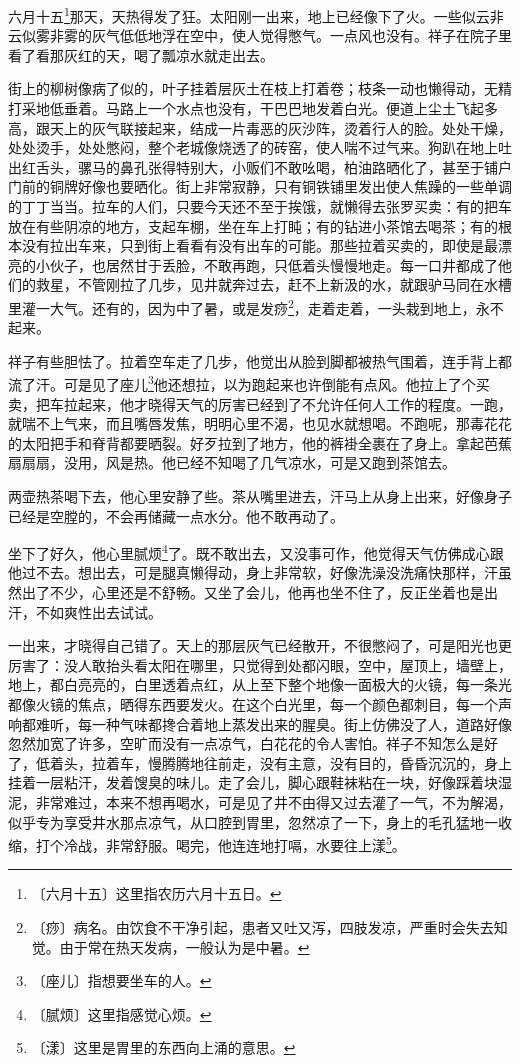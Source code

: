 \documentclass[12pt,UTF-8,openany]{ctexbook}
\begin{document}
\begin{large}
    
    六月十五\footnote{〔六月十五〕这里指农历六月十五日。}那天，天热得发了狂。太阳刚一出来，地上已经像下了火。一些似云非云似雾非雾的灰气低低地浮在空中，使人觉得憋气。一点风也没有。祥子在院子里看了看那灰红的天，喝了瓢凉水就走出去。
    
    街上的柳树像病了似的，叶子挂着层灰土在枝上打着卷；枝条一动也懒得动，无精打采地低垂着。马路上一个水点也没有，干巴巴地发着白光。便道上尘土飞起多高，跟天上的灰气联接起来，结成一片毒恶的灰沙阵，烫着行人的脸。处处干燥，处处烫手，处处憋闷，整个老城像烧透了的砖窑，使人喘不过气来。狗趴在地上吐出红舌头，骡马的鼻孔张得特别大，小贩们不敢吆喝，柏油路晒化了，甚至于铺户门前的铜牌好像也要晒化。街上非常寂静，只有铜铁铺里发出使人焦躁的一些单调的丁丁当当。拉车的人们，只要今天还不至于挨饿，就懒得去张罗买卖：有的把车放在有些阴凉的地方，支起车棚，坐在车上打盹；有的钻进小茶馆去喝茶；有的根本没有拉出车来，只到街上看看有没有出车的可能。那些拉着买卖的，即使是最漂亮的小伙子，也居然甘于丢脸，不敢再跑，只低着头慢慢地走。每一口井都成了他们的救星，不管刚拉了几步，见井就奔过去，赶不上新汲的水，就跟驴马同在水槽里灌一大气。还有的，因为中了暑，或是发痧\footnote{〔痧〕病名。由饮食不干净引起，患者又吐又泻，四肢发凉，严重时会失去知觉。由于常在热天发病，一般认为是中暑。}，走着走着，一头栽到地上，永不起来。
    
    祥子有些胆怯了。拉着空车走了几步，他觉出从脸到脚都被热气围着，连手背上都流了汗。可是见了座儿\footnote{〔座儿〕指想要坐车的人。}他还想拉，以为跑起来也许倒能有点风。他拉上了个买卖，把车拉起来，他才晓得天气的厉害已经到了不允许任何人工作的程度。一跑，就喘不上气来，而且嘴唇发焦，明明心里不渴，也见水就想喝。不跑呢，那毒花花的太阳把手和脊背都要晒裂。好歹拉到了地方，他的裤褂全裹在了身上。拿起芭蕉扇扇扇，没用，风是热。他已经不知喝了几气凉水，可是又跑到茶馆去。
    
    两壶热茶喝下去，他心里安静了些。茶从嘴里进去，汗马上从身上出来，好像身子已经是空膛的，不会再储藏一点水分。他不敢再动了。
    
    坐下了好久，他心里腻烦\footnote{〔腻烦〕这里指感觉心烦。}了。既不敢出去，又没事可作，他觉得天气仿佛成心跟他过不去。想出去，可是腿真懒得动，身上非常软，好像洗澡没洗痛快那样，汗虽然出了不少，心里还是不舒畅。又坐了会儿，他再也坐不住了，反正坐着也是出汗，不如爽性出去试试。
    
    一出来，才晓得自己错了。天上的那层灰气已经散开，不很憋闷了，可是阳光也更厉害了：没人敢抬头看太阳在哪里，只觉得到处都闪眼，空中，屋顶上，墙壁上，地上，都白亮亮的，白里透着点红，从上至下整个地像一面极大的火镜，每一条光都像火镜的焦点，晒得东西要发火。在这个白光里，每一个颜色都刺目，每一个声响都难听，每一种气味都搀合着地上蒸发出来的腥臭。街上仿佛没了人，道路好像忽然加宽了许多，空旷而没有一点凉气，白花花的令人害怕。祥子不知怎么是好了，低着头，拉着车，慢腾腾地往前走，没有主意，没有目的，昏昏沉沉的，身上挂着一层粘汗，发着馊臭的味儿。走了会儿，脚心跟鞋袜粘在一块，好像踩着块湿泥，非常难过，本来不想再喝水，可是见了井不由得又过去灌了一气，不为解渴，似乎专为享受井水那点凉气，从口腔到胃里，忽然凉了一下，身上的毛孔猛地一收缩，打个冷战，非常舒服。喝完，他连连地打嗝，水要往上漾\footnote{〔漾〕这里是胃里的东西向上涌的意思。}。
    

\end{large}
\end{document}
